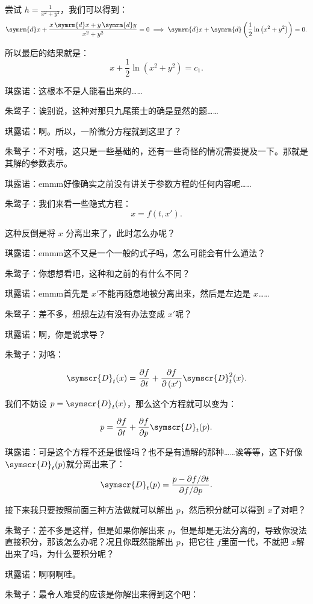 \documentclass{ctexart}
\newcommand{\dx}{\symscr{D} _t (x)}
\begin{document}
尝试 \(h=\frac{1}{x^2 +y^2 }\)，我们可以得到：
\[
    \symrm{d} x+ \frac{x\,\symrm{d} x+y\,\symrm{d} y}{x^2 +y^2 }=0\implies \symrm{d} x+\symrm{d} \left( \frac{1}{2}\ln \left( x^2 +y^2  \right)  \right) =0
    .\]

所以最后的结果就是：
\[
    x+ \frac{1}{2}\ln \left( x^2 +y^2  \right)=c_1
    .\]

琪露诺：这根本不是人能看出来的……

朱鹭子：诶别说，这种对那只九尾策士的确是显然的题……

琪露诺：啊。所以，一阶微分方程就到这里了？

朱鹭子：不对哦，这只是一些基础的，还有一些奇怪的情况需要提及一下。那就是其解的参数表示。

琪露诺：emmm好像确实之前没有讲关于参数方程的任何内容呢……

朱鹭子：我们来看一些隐式方程：
\[
    x=f(t,x')
    .\]

这种反倒是将 \(x\) 分离出来了，此时怎么办呢？

琪露诺：emmm这不又是一个一般的式子吗，怎么可能会有什么通法？

朱鹭子：你想想看吧，这种和之前的有什么不同？

琪露诺：emmm首先是 \(x'\)不能再随意地被分离出来，然后是左边是 \(x\)……

朱鹭子：差不多，想想左边有没有办法变成 \(x'\)呢？

琪露诺：啊，你是说求导？

朱鹭子：对咯：

\[
    \dx= \frac{\partial f}{\partial t}+ \frac{\partial f}{\partial \left( x' \right) }\symscr{D} _t^2(x)
    .\]

我们不妨设 \(p= \dx\)，那么这个方程就可以变为：

\[
    p=\frac{\partial f}{\partial t}+ \frac{\partial f}{\partial p}\symscr{D} _t(p)
    .\]

琪露诺：可是这个方程不还是很怪吗？也不是有通解的那种……诶等等，这下好像 \(\symscr{D} _t(p)\)就分离出来了：
\[
    \symscr{D} _t(p)= \frac{p-{\partial f}/{\partial t}}{{\partial f}/{\partial p}}
    .\]

接下来我只要按照前面三种方法做就可以解出 \(p\)，然后积分就可以得到 \(x\)了对吧？

朱鹭子：差不多是这样，但是如果你解出来 \(p\)，但是却是无法分离的，导致你没法直接积分，那该怎么办呢？况且你既然能解出 \(p\)，把它往 \(f\)里面一代，不就把 \(x\)解出来了吗，为什么要积分呢？

琪露诺：啊啊啊哇。

朱鹭子：最令人难受的应该是你解出来得到这个吧：
\end{document}
